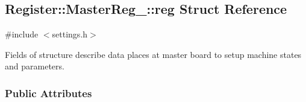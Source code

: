 \hypertarget{structRegister_1_1MasterReg___1_1reg}{}\subsection{Register\+:\+:Master\+Reg\+\_\+\+:\+:reg Struct Reference}
\label{structRegister_1_1MasterReg___1_1reg}


{\ttfamily \#include $<$settings.\+h$>$}

Fields of structure describe data places at master board to setup machine states and parameters.

\subsubsection*{Public Attributes}
